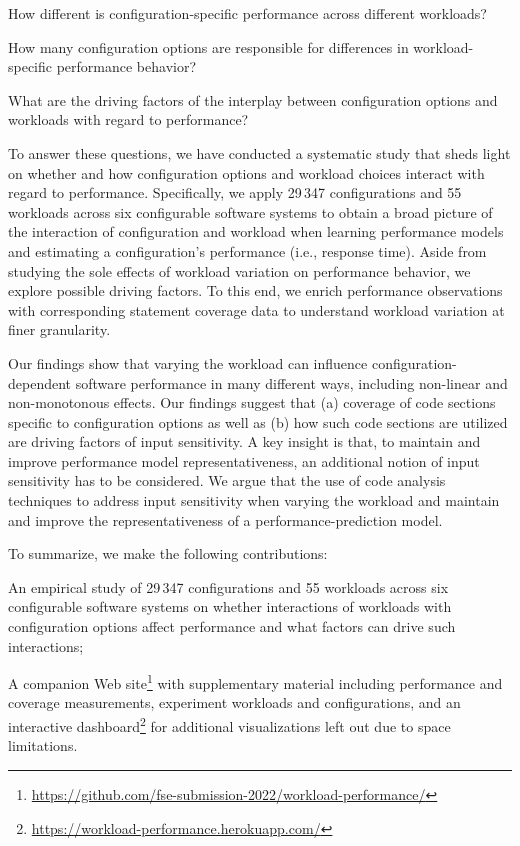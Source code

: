 \begin{compactitem}
	\item How different is configuration-specific performance across different workloads? 
	\item How many configuration options are responsible for differences in workload-specific performance behavior?
	\item What are the driving factors of the interplay between configuration options and workloads with regard to performance? 
\end{compactitem}

To answer these questions, we have conducted a systematic study that sheds light on whether and how configuration options and workload choices interact with regard to performance. 
Specifically, we apply 29\,347 configurations and 55 workloads across six configurable software systems to obtain a broad picture of the interaction of configuration and workload when learning performance models and estimating a configuration's performance (i.e., response time). Aside from studying the sole effects of workload variation on performance behavior, we explore possible driving factors. To this end, we enrich performance observations with corresponding statement coverage data to understand workload variation at finer granularity.

Our findings show that varying the workload can influence con\-fi\-gu\-ra\-tion-de\-pen\-dent software performance in many different ways, including non-linear and non-monotonous effects. Our findings suggest that (a) coverage of code sections specific to configuration options as well as (b) how such code sections are utilized are driving factors of input sensitivity. A key insight is that, to maintain and improve performance model representativeness, an additional notion of input sensitivity has to be considered. We argue that the use of code analysis techniques to address input sensitivity when varying the workload and maintain and improve the representativeness of a performance-prediction model.

To summarize, we make the following contributions: 

\begin{compactitem}
	\item An empirical study of 29\,347 configurations and 55 workloads across six configurable software systems on whether interactions of workloads with configuration options affect performance and what factors can drive such interactions;
	
	\item A companion Web site\footnote{\url{https://github.com/fse-submission-2022/workload-performance/}} with supplementary material including performance and coverage measurements, experiment workloads and configurations, and an interactive dashboard\footnote{\url{https://workload-performance.herokuapp.com/}} for additional visualizations left out due to space limitations.
\end{compactitem}


